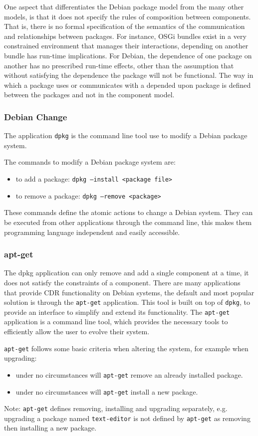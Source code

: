 One aspect that differentiates the Debian package model from the many other models, is that it does not specify the rules of composition between components.
That is, there is no formal specification of the semantics of the communication and relationships between packages.
For instance, OSGi bundles exist in a very constrained environment that manages their interactions, depending on another bundle has run-time implications.
For Debian, the dependence of one package on another has no prescribed run-time effects, other than the assumption that without satisfying the dependence the package will not be functional.
The way in which a package uses or communicates with a depended upon package is defined between the packages and not in the component model.

\subsubsection{Debian Change}
The application \texttt{dpkg} is the command line tool use to modify a Debian package system.

The commands to modify a Debian package system are:
\begin{itemize}
  \item to add a package: \texttt{dpkg --install <package file>}
  \item to remove a package: \texttt{dpkg --remove <package>}
\end{itemize}

These commands define the atomic actions to change a Debian system.
They can be executed from other applications through the command line, this makes them programming language independent and easily accessible. 

\subsubsection{apt-get}
The dpkg application can only remove and add a single component at a time, it does not satisfy the constraints of a component.
There are many applications that provide CDR functionality on Debian systems, the default and most popular solution is through the \texttt{apt-get} application.
This tool is built on top of \texttt{dpkg}, to provide an interface to simplify and extend its functionality.
The \texttt{apt-get} application is a command line tool, which provides the necessary tools to efficiently allow the user to evolve their system.

\texttt{apt-get} follows some basic criteria when altering the system, for example when upgrading:
\begin{itemize}
  \item under no circumstances will \texttt{apt-get} remove an already installed package.
  \item under no circumstances will \texttt{apt-get} install a new package.
\end{itemize}
Note: \texttt{apt-get} defines removing, installing and upgrading separately, e.g. upgrading a package named \texttt{text-editor} is not defined by  \texttt{apt-get} as removing then installing a new package.

